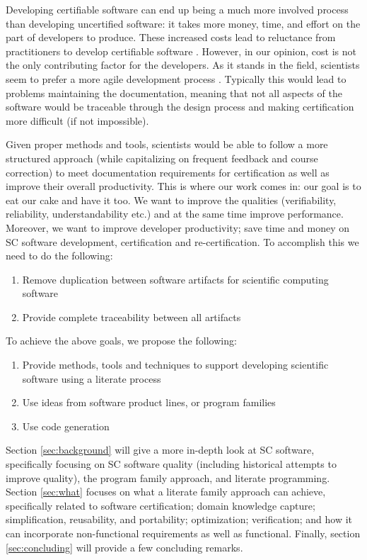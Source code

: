 \documentclass[10pt, preprint]{sigplanconf}
\begin{document}
Developing certifiable software can end up being a much more involved process
than developing uncertified software: it takes more money, time, and effort on
the part of developers to produce. These increased costs lead to reluctance from
practitioners to develop certifiable software \cite{Roache1998}. However, in
our %
opinion, cost is not the only contributing factor for the developers. As it
stands in the field, scientists seem to prefer a more agile development process
\cite{Segal2008}. Typically this would lead to problems maintaining the
documentation, meaning that not all aspects of the software would be traceable
through the design process and making certification more difficult (if not
impossible).

Given proper methods and tools, scientists would be able to follow a more
structured approach (while capitalizing on frequent feedback and course
correction) to meet documentation requirements for certification as well as
improve their overall productivity. This is where our work comes in: our goal is
to eat our cake and have it too.  We want to improve the qualities
(verifiability, reliability, understandability etc.) and at the same time
improve performance.  Moreover, we want to improve developer productivity; save
time and money on SC software development, certification and
re-certification. To accomplish this we need to do the following:

\begin{enumerate}
\item Remove duplication between software artifacts for scientific computing
  software \cite{WilsonEtAl2013}
\item Provide complete traceability between all artifacts
\end{enumerate}

To achieve the above goals, we propose the following:

\begin{enumerate}
\item Provide methods, tools and techniques to support developing scientific
  software using a literate process
\item Use ideas from software product lines, or program families
\item Use code generation
\end{enumerate}

Section \ref{sec:background} will give a more in-depth look at SC software,
specifically focusing on SC software quality (including historical attempts to
improve quality), the program family approach, and literate programming. Section
\ref{sec:what} focuses on what a literate family approach can achieve,
specifically related to software certification; domain knowledge capture;
simplification, reusability, and portability; optimization; verification; and
how it can incorporate non-functional requirements as well as
functional. Finally, section \ref{sec:concluding} will provide a few concluding
remarks.
\end{document}
